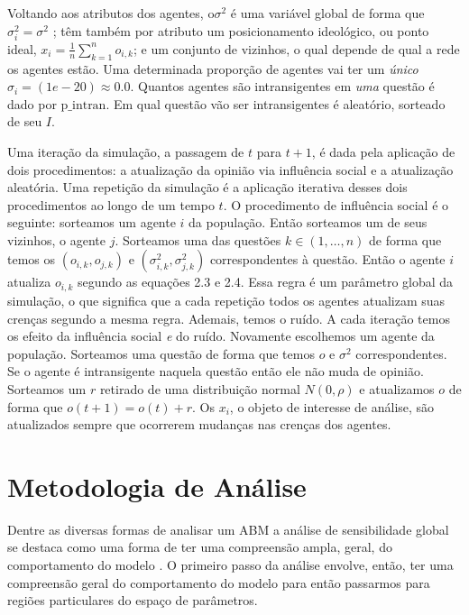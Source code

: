 Voltando aos atributos dos agentes, o\(\sigma^2\) é uma variável global de forma que
\(\sigma_i^2 = \sigma^2\) ; têm também por atributo um posicionamento ideológico, ou ponto
ideal, \(x_i = \frac{1}{n} \sum_{k = 1}^n o_{i,k} \); e um conjunto de vizinhos, o
qual depende de qual a rede os agentes estão. Uma determinada proporção de
agentes vai ter um \textit{único} \(\sigma_i = (1e-20 ) \approx 0.0 \). Quantos agentes são
intransigentes em \textit{uma} questão é dado por \(\text{p\_intran}\). Em qual
questão vão ser intransigentes é aleatório, sorteado de seu \(I\).

Uma iteração da simulação, a passagem de \(t\) para \(t+1\), é dada pela
aplicação de dois procedimentos: a atualização da opinião via influência social
e a atualização aleatória. Uma repetição da simulação é a aplicação iterativa
desses dois procedimentos ao longo de um tempo \(t \). O procedimento de
influência social é o seguinte: sorteamos um agente \(i\) da população. Então
sorteamos um de seus vizinhos, o agente \(j\). Sorteamos uma das questões \(k \in
(1,\ldots,n)\) de forma que temos os \((o_{i,k},o_{j,k})\) e
\((\sigma_{i,k}^2,\sigma_{j,k}^2)\) correspondentes à questão. Então o agente \(i\)
atualiza \(o_{i,k}\) segundo as equações 2.3 e 2.4. Essa regra é um parâmetro
global da simulação, o que significa que a cada repetição todos os agentes
atualizam suas crenças segundo a mesma regra. Ademais, temos o ruído. A cada
iteração temos os efeito da influência social \textit{e} do ruído. Novamente
escolhemos um agente da população. Sorteamos uma questão de forma que temos
\(o\) e \(\sigma^2\) correspondentes. Se o agente é intransigente naquela questão
então ele não muda de opinião. Sorteamos um \(r\) retirado de uma distribuição
normal \(N(0,\rho)\) e atualizamos \(o\) de forma que \(o(t+1) = o(t) + r\). Os
\(x_i\), o objeto de interesse de análise, são atualizados sempre que ocorrerem
mudanças nas crenças dos agentes.

\section{Metodologia de Análise}

Dentre as diversas formas de analisar um ABM a análise de sensibilidade global
se destaca como uma forma de ter uma compreensão ampla, geral, do comportamento
do modelo \cite{north2007managing}. O primeiro passo da análise envolve, então,
 ter uma compreensão geral do comportamento do modelo para então passarmos
para regiões particulares do espaço de parâmetros.

